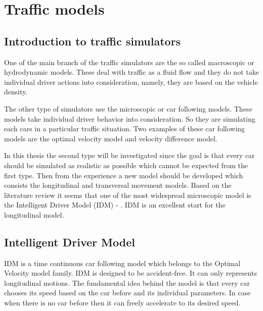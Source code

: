 \chapter{Traffic models}
	\section{Introduction to traffic simulators}
		One of the main branch of the traffic simulators are the so called macroscopic or hydrodynamic models. These deal with traffic as a fluid flow and they do not take individual driver actions into consideration, namely, they are based on the vehicle density.

		The other type of simulators use the microscopic or car following models. These models take individual driver behavior into consideration. So they are simulating each cars in a particular traffic situation. Two examples of these car following models are the optimal velocity model and velocity difference model.

		In this thesis the second type will be investigated since the goal is that every car should be simulated as realistic as possible which cannot be expected from the first type. Then from the experience a new model should be developed which consists the longitudinal and transversal movement models. Based on the literature review it seems that one of the most widespread microscopic model is the Intelligent Driver Model (IDM) \cite{arne1} - \cite{modified}. IDM is an excellent start for the longitudinal model.
	\section{Intelligent Driver Model} \label{sec:IDM}
		IDM is a time continuous car following model which belongs to the Optimal Velocity model family. IDM is designed to be accident-free. It can only represents longitudinal motions. The fundamental idea behind the model is that every car chooses its speed based on the car before and its individual parameters. In case when there is no car before then it can freely accelerate to its desired speed.

